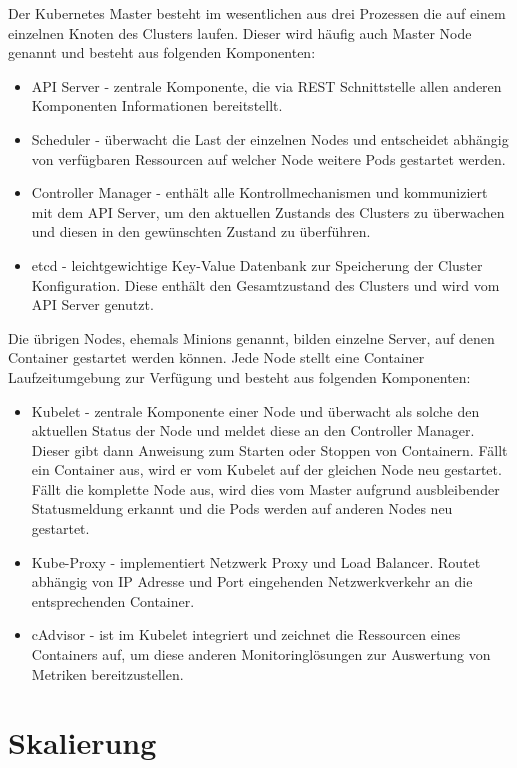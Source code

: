 Der Kubernetes Master besteht im wesentlichen aus drei Prozessen die auf einem einzelnen Knoten des Clusters laufen. Dieser wird häufig auch Master Node genannt und besteht aus folgenden Komponenten:
\begin{itemize}
	\item API Server - zentrale Komponente, die via REST Schnittstelle allen anderen Komponenten Informationen bereitstellt.
	\item Scheduler - überwacht die Last der einzelnen Nodes und entscheidet abhängig von verfügbaren Ressourcen auf welcher Node weitere Pods gestartet werden.
	\item Controller Manager - enthält alle Kontrollmechanismen und kommuniziert mit dem API Server, um den aktuellen Zustands des Clusters zu überwachen und diesen in den gewünschten Zustand zu überführen.
	\item etcd - leichtgewichtige Key-Value Datenbank zur Speicherung der Cluster Konfiguration. Diese enthält den Gesamtzustand des Clusters und wird vom API Server genutzt.
\end{itemize}\newpage

Die übrigen Nodes, ehemals Minions genannt, bilden einzelne Server, auf denen Container gestartet werden können.
Jede Node stellt eine Container Laufzeitumgebung zur Verfügung und besteht aus folgenden Komponenten:

\begin{itemize}
	\item Kubelet - zentrale Komponente einer Node und überwacht als solche den aktuellen Status der Node und meldet diese an den Controller Manager. Dieser gibt dann Anweisung zum Starten oder Stoppen von Containern. Fällt ein Container aus, wird er vom Kubelet auf der gleichen Node neu gestartet. Fällt die komplette Node aus, wird dies vom Master aufgrund ausbleibender Statusmeldung erkannt und die Pods werden auf anderen Nodes neu gestartet.
	\item Kube-Proxy - implementiert Netzwerk Proxy und Load Balancer. Routet abhängig von IP Adresse und Port eingehenden Netzwerkverkehr an die entsprechenden Container.
	\item cAdvisor - ist im Kubelet integriert und zeichnet die Ressourcen eines Containers auf, um diese anderen Monitoringlösungen zur Auswertung von Metriken bereitzustellen.
\end{itemize}

\newpage

\section{Skalierung}

